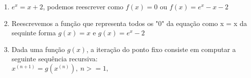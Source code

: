 \documentclass{article}
\begin{document}
\begin{multicols}{2}
    \begin{enumerate}
        \item $ e^x = x + 2 $, podemos reescrever como $ f(x) = 0 $ ou $ f(x) = e^x - x - 2 $
        \item Reescrevemos a função que representa todos os "0" da equação como x = x da sequinte forma $ g(x) = x $ e $ g(x) = e^x - 2 $ 
        \item Dada uma função $ g(x) $, a iteração do ponto fixo consiste em computar a seguinte sequência recursiva: \\ $ x^{(n+1)} = g(x^{(n)}),\  n >= 1, $
    \end{enumerate}



\end{multicols}
\end{document}
